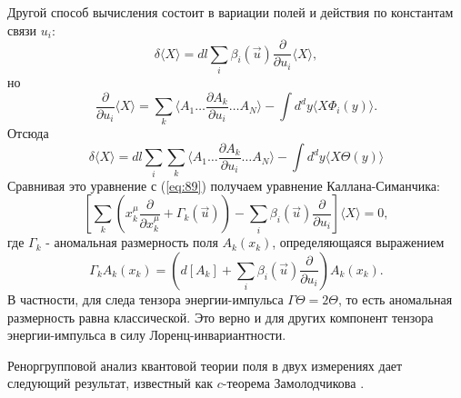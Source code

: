 \documentclass[a4paper,12pt]{article}
\theoremstyle{definition}
\theoremstyle{definition}
\theoremstyle{definition}
\begin{document}
Другой способ вычисления состоит в вариации полей и действия по константам связи $u_i$:
\begin{equation}
  \label{eq:90}
  \delta\langle X\rangle=dl\sum_i \beta_i(\vec u)\frac{\partial}{\partial u_i}\langle X\rangle,
\end{equation}
но
\begin{equation}
  \label{eq:91}
  \frac{\partial}{\partial u_i}\langle X\rangle=\sum_k \langle A_1\dots \frac{\partial A_k}{\partial u_i}\dots A_N\rangle-\int d^d y \langle X \Phi_i(y)\rangle.
\end{equation}
Отсюда
\begin{equation}
  \label{eq:92}
  \delta\langle X\rangle=dl \sum_i \sum_k\langle A_1\dots \frac{\partial A_k}{\partial u_i}\dots A_N\rangle-\int d^d y \langle X \Theta(y)\rangle
\end{equation}
Сравнивая это уравнение с (\ref{eq:89}) получаем уравнение Каллана-Симанчика:
\begin{equation}
  \label{eq:93}
  \left[ \sum_k\left( x^{\mu}_k \frac{\partial}{\partial x^{\mu}_k}+\Gamma_k(\vec u)\right) -\sum_i \beta_i(\vec u)\frac{\partial }{\partial u_i}\right]\langle X\rangle=0,
\end{equation}
где $\Gamma_k$ - аномальная размерность поля $A_k(x_k)$, определяющаяся выражением
\begin{equation}
  \label{eq:94}
  \Gamma_k A_k(x_k)=\left( d[A_k]+\sum_i \beta_i(\vec u) \frac{\partial }{\partial u_i}\right) A_k(x_k).
\end{equation}
В частности, для следа тензора энергии-импульса $\Gamma \Theta=2 \Theta$, то есть аномальная размерность равна классической. Это верно и для других компонент тензора энергии-импульса в силу Лоренц-инвариантности.

Реноргрупповой анализ квантовой теории поля в двух измерениях дает следующий результат, известный как $c$-теорема Замолодчикова \cite{zamolodchikov1986irreversibility}.
\end{document}
